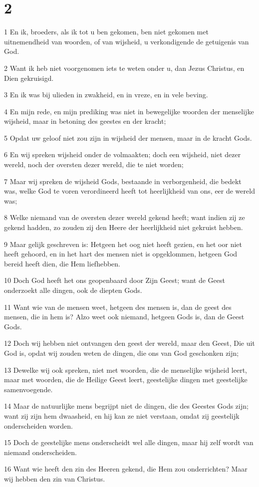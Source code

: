 \chapter{2}

\par 1 En ik, broeders, als ik tot u ben gekomen, ben niet gekomen met uitnemendheid van woorden, of van wijsheid, u verkondigende de getuigenis van God.
\par 2 Want ik heb niet voorgenomen iets te weten onder u, dan Jezus Christus, en Dien gekruisigd.
\par 3 En ik was bij ulieden in zwakheid, en in vreze, en in vele beving.
\par 4 En mijn rede, en mijn prediking was niet in bewegelijke woorden der menselijke wijsheid, maar in betoning des geestes en der kracht;
\par 5 Opdat uw geloof niet zou zijn in wijsheid der mensen, maar in de kracht Gods.
\par 6 En wij spreken wijsheid onder de volmaakten; doch een wijsheid, niet dezer wereld, noch der oversten dezer wereld, die te niet worden;
\par 7 Maar wij spreken de wijsheid Gods, bestaande in verborgenheid, die bedekt was, welke God te voren verordineerd heeft tot heerlijkheid van ons, eer de wereld was;
\par 8 Welke niemand van de oversten dezer wereld gekend heeft; want indien zij ze gekend hadden, zo zouden zij den Heere der heerlijkheid niet gekruist hebben.
\par 9 Maar gelijk geschreven is: Hetgeen het oog niet heeft gezien, en het oor niet heeft gehoord, en in het hart des mensen niet is opgeklommen, hetgeen God bereid heeft dien, die Hem liefhebben.
\par 10 Doch God heeft het ons geopenbaard door Zijn Geest; want de Geest onderzoekt alle dingen, ook de diepten Gods.
\par 11 Want wie van de mensen weet, hetgeen des mensen is, dan de geest des mensen, die in hem is? Alzo weet ook niemand, hetgeen Gods is, dan de Geest Gods.
\par 12 Doch wij hebben niet ontvangen den geest der wereld, maar den Geest, Die uit God is, opdat wij zouden weten de dingen, die ons van God geschonken zijn;
\par 13 Dewelke wij ook spreken, niet met woorden, die de menselijke wijsheid leert, maar met woorden, die de Heilige Geest leert, geestelijke dingen met geestelijke samenvoegende.
\par 14 Maar de natuurlijke mens begrijpt niet de dingen, die des Geestes Gods zijn; want zij zijn hem dwaasheid, en hij kan ze niet verstaan, omdat zij geestelijk onderscheiden worden.
\par 15 Doch de geestelijke mens onderscheidt wel alle dingen, maar hij zelf wordt van niemand onderscheiden.
\par 16 Want wie heeft den zin des Heeren gekend, die Hem zou onderrichten? Maar wij hebben den zin van Christus.

